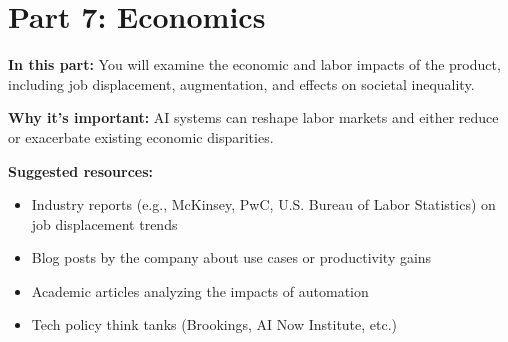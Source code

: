 \documentclass{article}
\theoremstyle{case}
\theoremstyle{definition}
\begin{document}
\section*{Part 7: Economics}

\textbf{In this part:} You will examine the economic and labor impacts of the product, including job displacement, augmentation, and effects on societal inequality.

\vspace{2mm}

\textbf{Why it's important:} AI systems can reshape labor markets and either reduce or exacerbate existing economic disparities.

\vspace{2mm}

\textbf{Suggested resources:}
\begin{itemize}
  \item Industry reports (e.g., McKinsey, PwC, U.S. Bureau of Labor Statistics) on job displacement trends
  \item Blog posts by the company about use cases or productivity gains
  \item Academic articles analyzing the impacts of automation
  \item Tech policy think tanks (Brookings, AI Now Institute, etc.)
\end{itemize}
\end{document}
